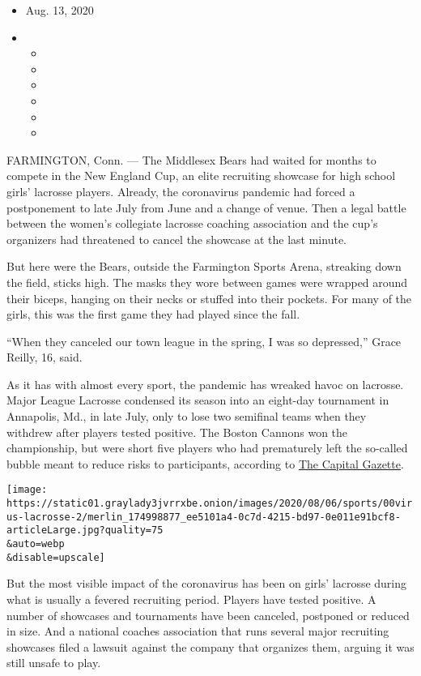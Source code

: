 \begin{itemize}
\item
  Aug. 13, 2020
\item
  \begin{itemize}
  \item
  \item
  \item
  \item
  \item
  \item
  \end{itemize}
\end{itemize}

FARMINGTON, Conn. --- The Middlesex Bears had waited for months to
compete in the New England Cup, an elite recruiting showcase for high
school girls' lacrosse players. Already, the coronavirus pandemic had
forced a postponement to late July from June and a change of venue. Then
a legal battle between the women's collegiate lacrosse coaching
association and the cup's organizers had threatened to cancel the
showcase at the last minute.

But here were the Bears, outside the Farmington Sports Arena, streaking
down the field, sticks high. The masks they wore between games were
wrapped around their biceps, hanging on their necks or stuffed into
their pockets. For many of the girls, this was the first game they had
played since the fall.

``When they canceled our town league in the spring, I was so
depressed,'' Grace Reilly, 16, said.

As it has with almost every sport, the pandemic has wreaked havoc on
lacrosse. Major League Lacrosse condensed its season into an eight-day
tournament in Annapolis, Md., in late July, only to lose two semifinal
teams when they withdrew after players tested positive. The Boston
Cannons won the championship, but were short five players who had
prematurely left the so-called bubble meant to reduce risks to
participants, according to
\href{https://www.capitalgazette.com/sports/ac-cs-major-league-lacrosse-bubble-20200726-3le2uhmqejfv5hqoza4hqjrcaq-story.html}{The
Capital Gazette}.

\texttt{[image: https://static01.graylady3jvrrxbe.onion/images/2020/08/06/sports/00virus-lacrosse-2/merlin\_174998877\_ee5101a4-0c7d-4215-bd97-0e011e91bcf8-articleLarge.jpg?quality=75\\\&auto=webp\\\&disable=upscale]}

But the most visible impact of the coronavirus has been on girls'
lacrosse during what is usually a fevered recruiting period. Players
have tested positive. A number of showcases and tournaments have been
canceled, postponed or reduced in size. And a national coaches
association that runs several major recruiting showcases filed a lawsuit
against the company that organizes them, arguing it was still unsafe to
play.

